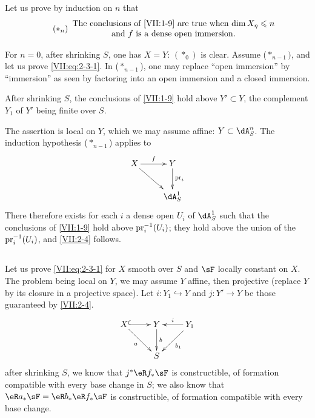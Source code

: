 Let us prove by induction on $n$ that
\begin{equation*}\tag{$\ast_n$}\label{VII:eq:2-3-1}
  \begin{array}{c}
    \text{The conclusions of \ref{VII:1-9} are true when $\dim{X_\eta}\leqslant n$} \\
    \text{and $f$ is a dense open immersion.}
  \end{array}
\end{equation*}

For $n=0$, after shrinking $S$, one has $X=Y$: $(\ast_0)$ is clear.
Assume ($\ast_{n-1})$, and let us prove \eqref{VII:eq:2-3-1}. In
($\ast_{n-1}$), one may replace ``open immersion'' by ``immersion''
as seen by factoring into an open immersion and a closed immersion.




\begin{lemma_}\label{VII:2-4}
After shrinking $S$, the conclusions of \ref{VII:1-9} hold
above $Y'\subset Y$, the complement $Y_1$ of $Y'$ being finite over $S$.
\end{lemma_}

The assertion is local on $Y$, which we may assume affine: $Y\subset \dA_S^n$.
The induction hypothesis ($\ast_{n-1}$) applies to
\[\xymatrix{
  X \ar[r]^-f \ar[dr]
    & Y \ar[d]^-{\pr_i} \\
  & \dA_S^1
}\]
There therefore exists for each $i$ a dense open $U_i$ of $\dA_S^1$ such that the
conclusions of \ref{VII:1-9} hold above $\mathrm{pr}_i^{-1}(U_i)$; they hold
above the union of the $\mathrm{pr}_i^{-1}(U_i)$, and \ref{VII:2-4} follows.




\addtocounter{subsection}{1} %
\subsection{}\label{VII:2-6}

Let us prove \eqref{VII:eq:2-3-1} for $X$ smooth over $S$ and $\sF$ locally
constant on $X$. The problem being local on $Y$, we may assume $Y$
affine, then projective (replace $Y$ by its closure in a projective
space). Let $i:Y_1\hookrightarrow Y$ and $j:Y' \to Y$ be those guaranteed by
\ref{VII:2-4}.
\[\xymatrix{
  X \ar@{^{(}->}[r] \ar[dr]_-a
    & Y \ar[d]^-b
    & \ar[l]_-i \ar[dl]^-{b_1} Y_1 \\
  & S
}\]
after shrinking $S$, we know that $j^\ast \eR f_\ast \sF$ is
constructible, of formation compatible with every base change in $S$; we
also know that $\eR a_\ast \sF = \eR b_\ast \eR f_\ast \sF$ is constructible,
of formation compatible with every base change.


